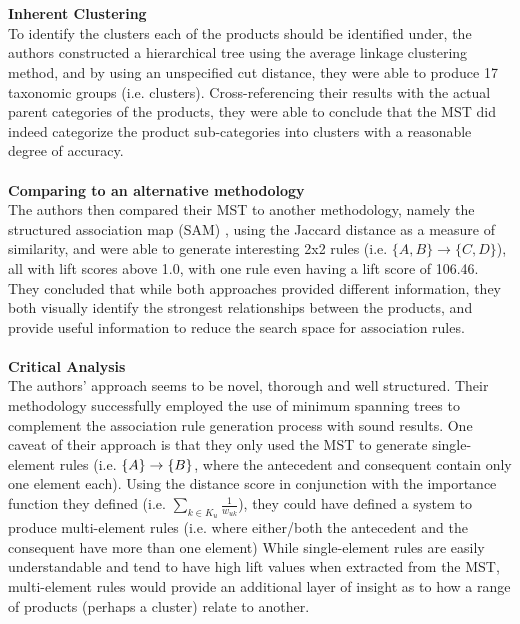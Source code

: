 \\\\\textbf{Inherent Clustering}\\
To identify the clusters each of the products should be identified under, the authors constructed a hierarchical tree using the average linkage clustering method, and by using an unspecified cut distance, they were able to produce 17 taxonomic groups (i.e. clusters). Cross-referencing their results with the actual parent categories of the products, they were able to conclude that the MST did indeed categorize the product sub-categories into clusters with a reasonable degree of accuracy.
\\\\\textbf{Comparing to an alternative methodology}\\
The authors then compared their MST to another methodology, namely the structured association map (SAM) , using the Jaccard distance as a measure of similarity,  and were able to generate interesting 2x2 rules (i.e. $\{A,B\}\rightarrow\{C, D\}$), all with lift scores above 1.0, with one rule even having a lift score of 106.46. They concluded that while both approaches provided different information, they both visually identify the strongest relationships between the products, and provide useful information to reduce the search space for association rules.
\\\\\textbf{Critical Analysis}\\
The authors' approach seems to be novel,  thorough and well structured.  Their methodology successfully employed the use of minimum spanning trees to complement the association rule generation process with sound results.  One caveat of their approach is that they only used the MST to generate single-element rules (i.e. $\{A\}\rightarrow\{B\}$, where the antecedent and consequent contain only one element each). Using the distance score in conjunction with the importance function they defined (i.e. $\sum\limits_{k \in K_u}^{} \frac{1}{w_{uk}}$), they could have defined a system to produce multi-element rules (i.e. where either/both the antecedent and the consequent have more than one element) While single-element rules are easily understandable and tend to have high lift values when extracted from the MST, multi-element rules would provide an additional layer of insight as to how a range of products (perhaps a cluster) relate to another.


